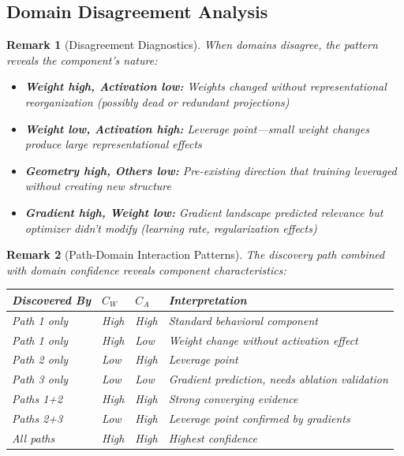 \documentclass[11pt]{article}
\newtheorem{remark}{Remark}[section]
\begin{document}
\subsection{Domain Disagreement Analysis}
\label{sec:domain-disagreement-analysis}

\begin{remark}[Disagreement Diagnostics]
\label{rem:disagreement-diagnostics}
When domains disagree, the pattern reveals the component's nature:
\begin{itemize}[nosep]
\item \textbf{Weight high, Activation low:} Weights changed without representational reorganization (possibly dead or redundant projections)
\item \textbf{Weight low, Activation high:} Leverage point---small weight changes produce large representational effects
\item \textbf{Geometry high, Others low:} Pre-existing direction that training leveraged without creating new structure
\item \textbf{Gradient high, Weight low:} Gradient landscape predicted relevance but optimizer didn't modify (learning rate, regularization effects)
\end{itemize}
\end{remark}

\begin{remark}[Path-Domain Interaction Patterns]
\label{rem:path-domain-interaction-patterns}
The discovery path combined with domain confidence reveals component characteristics:

\begin{center}
\begin{tabular}{llll}
\toprule
\textbf{Discovered By} & $C_W$ & $C_A$ & \textbf{Interpretation} \\
\midrule
Path 1 only & High & High & Standard behavioral component \\
Path 1 only & High & Low & Weight change without activation effect \\
Path 2 only & Low & High & Leverage point \\
Path 3 only & Low & Low & Gradient prediction, needs ablation validation \\
Paths 1+2 & High & High & Strong converging evidence \\
Paths 2+3 & Low & High & Leverage point confirmed by gradients \\
All paths & High & High & Highest confidence \\
\bottomrule
\end{tabular}
\end{center}
\end{remark}
\end{document}
